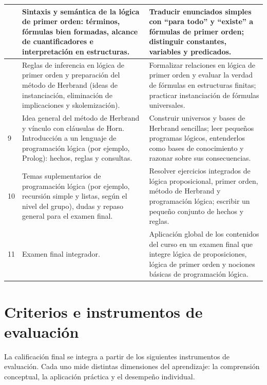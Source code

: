 \documentclass[12pt]{article}
\begin{document}
\begin{longtable}{|>{\centering\arraybackslash}p{1.2cm}|p{7.2cm}|p{7.2cm}|}
	7 &
	Sintaxis y semántica de la lógica de primer orden: términos, fórmulas bien formadas, alcance de cuantificadores e interpretación en estructuras. &
	Traducir enunciados simples con ``para todo'' y ``existe'' a fórmulas de primer orden; distinguir constantes, variables y predicados. \\
	\hline
	
	8 &
	Reglas de inferencia en lógica de primer orden y preparación del método de Herbrand (ideas de instanciación, eliminación de implicaciones y skolemización). &
	Formalizar relaciones en lógica de primer orden y evaluar la verdad de fórmulas en estructuras finitas; practicar instanciación de fórmulas universales. \\
	\hline
	
	9 &
	Idea general del método de Herbrand y vínculo con cláusulas de Horn. Introducción a un lenguaje de programación lógica (por ejemplo, Prolog): hechos, reglas y consultas. &
	Construir universos y bases de Herbrand sencillas; leer pequeños programas lógicos, entenderlos como bases de conocimiento y razonar sobre sus consecuencias. \\
	\hline
	
	10 &
	Temas suplementarios de programación lógica (por ejemplo, recursión simple y listas, según el nivel del grupo), dudas y repaso general para el examen final. &
	Resolver ejercicios integrados de lógica proposicional, primer orden, método de Herbrand y programación lógica; escribir un pequeño conjunto de hechos y reglas. \\
	\hline
	
	11 &
	Examen final integrador. &
	Aplicación global de los contenidos del curso en un examen final que integre lógica de proposiciones, lógica de primer orden y nociones básicas de programación lógica. \\
	\hline
	
\end{longtable}



	
	\section*{Criterios e instrumentos de evaluación}
	
	La calificación final se integra a partir de los siguientes instrumentos de evaluación. Cada uno mide distintas dimensiones del aprendizaje: la comprensión conceptual, la aplicación práctica y el desempeño individual.
	
\end{document}
